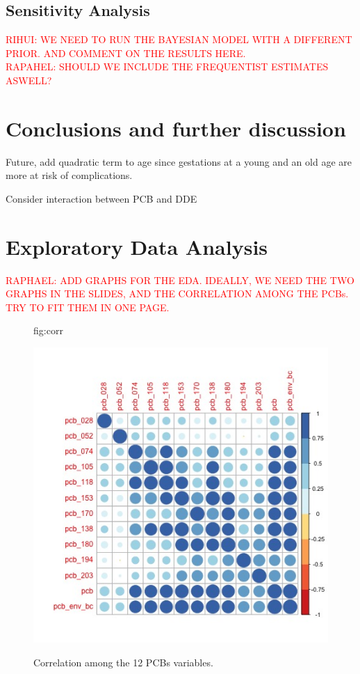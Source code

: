 \documentclass[wcp]{jmlr}%
\begin{document}
\subsection{Sensitivity Analysis}
\textcolor{red}{RIHUI: WE NEED TO RUN THE BAYESIAN MODEL WITH A DIFFERENT PRIOR. AND COMMENT ON THE RESULTS HERE. \\
RAPAHEL: SHOULD WE INCLUDE THE FREQUENTIST ESTIMATES ASWELL?}
\section{Conclusions and further discussion}
\label{sec:conclusion}

Future, add quadratic term to age since gestations at a young and an old age are more at risk of complications.

Consider interaction between PCB and DDE

\newpage
\section*{Exploratory Data Analysis}
\textcolor{red}{RAPHAEL: ADD GRAPHS FOR THE EDA. IDEALLY, WE NEED THE TWO GRAPHS IN THE SLIDES, AND THE CORRELATION AMONG THE PCBs. TRY TO FIT THEM IN ONE PAGE.}
\begin{figure}[htbp]
	\floatconts
	{fig:corr}
	{\caption{Correlation among the 12 PCBs variables.}}
	{\includegraphics[width=0.8\linewidth]{pcb_corr}}
\end{figure}
\end{document}

